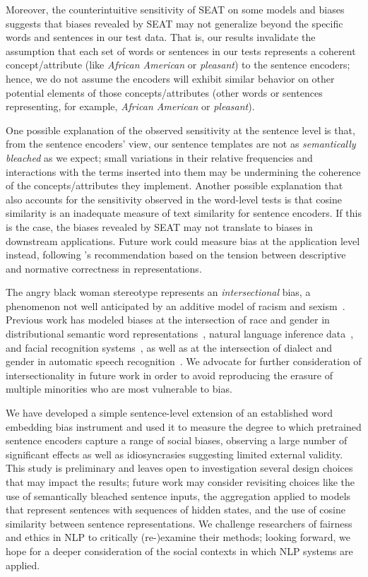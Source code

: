 \documentclass[11pt,a4paper]{article}
\begin{document}
Moreover, the counterintuitive sensitivity of SEAT on some models and biases suggests that biases revealed by SEAT may not generalize beyond the specific words and sentences in our test data.
That is, our results invalidate the assumption that each set of words or sentences in our tests represents a coherent concept/attribute (like \emph{African American} or \emph{pleasant}) to the sentence encoders; hence, we do not assume the encoders will exhibit similar behavior on other potential elements of those concepts/attributes (other words or sentences representing, for example, \emph{African American} or \emph{pleasant}).

One possible explanation of the observed sensitivity at the sentence level is that, from the sentence encoders' view, our sentence templates are not as \emph{semantically bleached} as we expect; small variations in their relative frequencies and interactions with the terms inserted into them may be undermining the coherence of the concepts/attributes they implement.
Another possible explanation that also accounts for the sensitivity observed in the word-level tests is that cosine similarity is an inadequate measure of text similarity for sentence encoders.
If this is the case, the biases revealed by SEAT may not translate to biases in downstream applications.
Future work could measure bias at the application level instead, following \citet{bailey2018}'s recommendation based on the tension between descriptive and normative correctness in representations.

The angry black woman stereotype represents an \emph{intersectional} bias, a phenomenon not well anticipated by an additive model of racism and sexism~\cite{crenshaw1989demarginalizing}.
Previous work has modeled biases at the intersection of race and gender in distributional semantic word representations~\cite{herbelot2012distributional}, natural language inference data~\cite{rudinger2017social}, and facial recognition systems~\cite{buolamwini2018gender}, as well as at the intersection of dialect and gender in automatic speech recognition~\cite{tatman2017gender}.
We advocate for further consideration of intersectionality in future work in order to avoid reproducing the erasure of multiple minorities who are most vulnerable to bias.

We have developed a simple sentence-level extension of an established word embedding bias instrument and
used it to measure the degree to which pretrained sentence encoders capture a range of social biases, observing a large number of significant effects as well as idiosyncrasies suggesting limited external validity.
This study is preliminary and leaves open to investigation several design choices that may impact the results; future work may consider revisiting choices like the use of semantically bleached sentence inputs, the aggregation applied to models that represent sentences with sequences of hidden states, and the use of cosine similarity between sentence representations.
We challenge researchers of fairness and ethics in NLP to critically (re-)examine their methods; looking forward, we hope for a deeper consideration of the social contexts in which NLP systems are applied.
\end{document}
